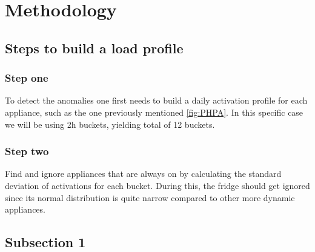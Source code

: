 \section{Methodology}

\subsection{Steps to build a load profile}
\subsubsection{Step one}
To detect the anomalies one first needs to build a daily activation profile for each appliance, such as the one previously mentioned \ref{fig:PHPA}.
In this specific case we will be using 2h buckets, yielding total of 12 buckets. 

\subsubsection{Step two}
Find and ignore appliances that are always on by calculating the standard deviation of activations for each bucket.
During this, the fridge should get ignored since its normal distribution is quite narrow compared to other more dynamic appliances.

\subsection{}


\subsection{Subsection 1}

